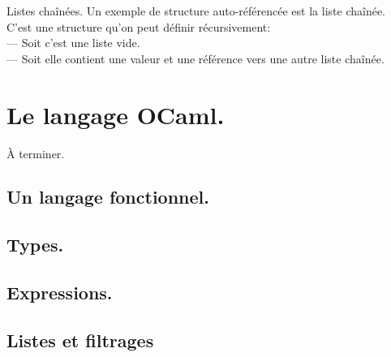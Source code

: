 \documentclass[french, 11pt]{article}
\begin{document}
\begin{ex}{Listes chaînées.}{}
    Un exemple de structure auto-référencée est la liste chaînée.\\
    C'est une structure qu'on peut définir récursivement:\\
    --- Soit c'est une liste vide.\\
    --- Soit elle contient une valeur et une référence vers une autre liste chaînée.
\end{ex}

\section{Le langage OCaml.}

\begin{center}
    À terminer.
\end{center}

\subsection{Un langage fonctionnel.}

\subsection{Types.}

\subsection{Expressions.}

\subsection{Listes et filtrages}
\end{document}

